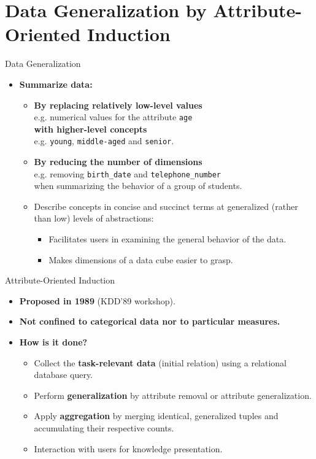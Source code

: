 \section{Data Generalization by Attribute-Oriented Induction}

\begin{frame}{Data Generalization}
	\begin{itemize}
		\item \textbf{Summarize data:}
		      \begin{itemize}
			      \item \textbf{By replacing relatively low-level values} \\
			            e.g. numerical values for the attribute \texttt{age} \\
			            \textbf{with higher-level concepts}\\
			            e.g. \texttt{young}, \texttt{middle-aged} and \texttt{senior}.
			      \item \textbf{By reducing the number of dimensions}\\
			            e.g. removing \texttt{birth\_date} and \texttt{telephone\_number} \\ when summarizing the behavior of a group of students.
			      \item Describe concepts in concise and succinct terms at generalized (rather than low) levels of abstractions:
			            \begin{itemize}
				            \item Facilitates users in examining the general behavior of the data.
				            \item Makes dimensions of a data cube easier to grasp.
			            \end{itemize}
		      \end{itemize}
	\end{itemize}
\end{frame}

\begin{frame}{Attribute-Oriented Induction}
	\begin{itemize}
		\item \textbf{Proposed in 1989} (KDD'89 workshop).
		\item \textbf{Not confined to categorical data nor to particular measures.}
		\item \textbf{How is it done?}
		      \begin{itemize}
			      \item Collect the \textbf{\color{airforceblue}task-relevant data} (initial relation) using a relational database query.
			      \item Perform \textbf{\color{airforceblue}generalization} by attribute removal or attribute generalization.
			      \item Apply \textbf{\color{airforceblue}aggregation} by merging identical, generalized tuples and \\ accumulating their respective counts.
			      \item Interaction with users for knowledge presentation.
		      \end{itemize}
	\end{itemize}
\end{frame}

